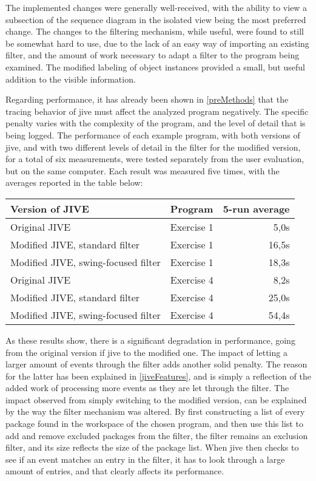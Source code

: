 The implemented changes were generally well-received, with the ability to view a subsection of the sequence diagram in the isolated view being the most preferred change.
The changes to the filtering mechanism, while useful, were found to still be somewhat hard to use, due to the lack of an easy way of importing an existing filter, and the amount of work necessary to adapt a filter to the program being examined.
The modified labeling of object instances provided a small, but useful addition to the visible information.

Regarding performance, it has already been shown in \autoref{preMethods} that the tracing behavior of \gls{jive} must affect the analyzed program negatively.
The specific penalty varies with the complexity of the program, and the level of detail that is being logged.
The performance of each example program, with both versions of \gls{jive}, and with two different levels of detail in the filter for the modified version, for a total of six measurements, were tested separately from the user evaluation, but on the same computer.
Each result was measured five times, with the averages reported in the table below:

\begin{center}
	\begin{tabular}{|l|l|r|}
		\hline
		Version of JIVE & Program & 5-run average\\ \hline
		Original JIVE & Exercise 1 & 5,0s\\ \hline	
		Modified JIVE, standard filter & Exercise 1 & 16,5s\\ \hline	
		Modified JIVE, swing-focused filter & Exercise 1 & 18,3s\\ \hline
		Original JIVE & Exercise 4 & 8,2s\\ \hline	
		Modified JIVE, standard filter & Exercise 4 & 25,0s\\ \hline	
		Modified JIVE, swing-focused filter & Exercise 4 & 54,4s\\ \hline
	\end{tabular}
\end{center}

As these results show, there is a significant degradation in performance, going from the original version if \gls{jive} to the modified one.
The impact of letting a larger amount of events through the filter adds another solid penalty.
The reason for the latter has been explained in \autoref{jiveFeatures}, and is simply a reflection of the added work of processing more events as they are let through the filter.
The impact observed from simply switching to the modified version, can be explained by the way the filter mechanism was altered.
By first constructing a list of every package found in the workspace of the chosen program, and then use this list to add and remove excluded packages from the filter, the filter remains an exclusion filter, and its size reflects the size of the package list.
When \gls{jive} then checks to see if an event matches an entry in the filter, it has to look through a large amount of entries, and that clearly affects its performance.


